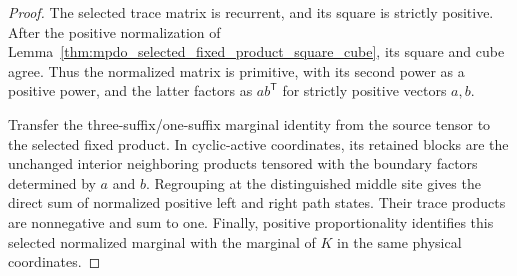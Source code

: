 \begin{proof}\leanok
    The selected trace matrix is recurrent, and its square is strictly
    positive. After the positive normalization of
    Lemma~\ref{thm:mpdo_selected_fixed_product_square_cube}, its square and
    cube agree. Thus the normalized matrix is primitive, with its second
    power as a positive power, and the latter factors as
    $a b^{\mathsf T}$ for strictly positive vectors $a,b$.

    Transfer the three-suffix/one-suffix marginal identity from the source
    tensor to the selected fixed product. In cyclic-active coordinates, its
    retained blocks are the unchanged interior neighboring products tensored
    with the boundary factors determined by $a$ and $b$. Regrouping at the
    distinguished middle site gives the direct sum of normalized positive
    left and right path states. Their trace products are nonnegative and sum
    to one. Finally, positive proportionality identifies this selected
    normalized marginal with the marginal of $K$ in the same physical
    coordinates.
\end{proof}

